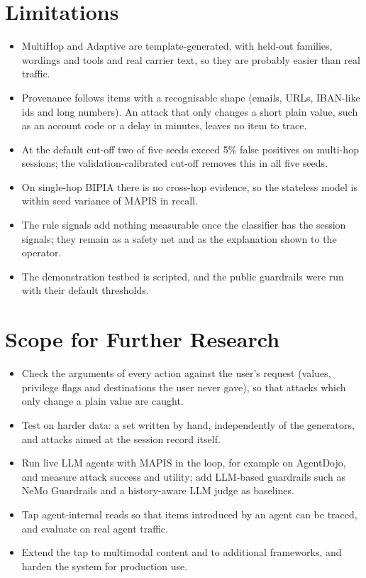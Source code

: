 \section{Limitations}
\begin{itemize}
\item MultiHop and Adaptive are template-generated, with held-out families, wordings and tools and real carrier text, so they are probably easier than real traffic.
\item Provenance follows items with a recognisable shape (emails, URLs, IBAN-like ids and long numbers). An attack that only changes a short plain value, such as an account code or a delay in minutes, leaves no item to trace.
\item At the default cut-off two of five seeds exceed 5\% false positives on multi-hop sessions; the validation-calibrated cut-off removes this in all five seeds.
\item On single-hop BIPIA there is no cross-hop evidence, so the stateless model is within seed variance of MAPIS in recall.
\item The rule signals add nothing measurable once the classifier has the session signals; they remain as a safety net and as the explanation shown to the operator.
\item The demonstration testbed is scripted, and the public guardrails were run with their default thresholds.
\end{itemize}

\section{Scope for Further Research}
\begin{itemize}
\item Check the arguments of every action against the user's request (values, privilege flags and destinations the user never gave), so that attacks which only change a plain value are caught.
\item Test on harder data: a set written by hand, independently of the generators, and attacks aimed at the session record itself.
\item Run live LLM agents with MAPIS in the loop, for example on AgentDojo, and measure attack success and utility; add LLM-based guardrails such as NeMo Guardrails and a history-aware LLM judge as baselines.
\item Tap agent-internal reads so that items introduced by an agent can be traced, and evaluate on real agent traffic.
\item Extend the tap to multimodal content and to additional frameworks, and harden the system for production use.
\end{itemize}
